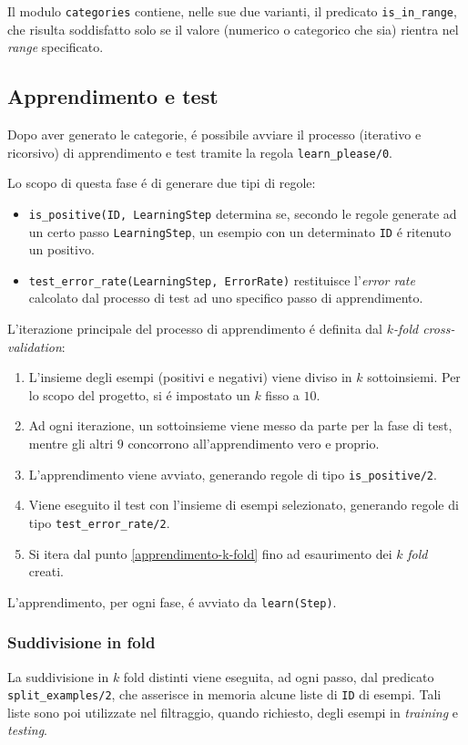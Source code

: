 \documentclass[preprint]{acm_proc_article-sp}
\begin{document}
Il modulo \verb|categories| contiene, nelle sue due varianti, il predicato \verb|is_in_range|, che risulta soddisfatto solo se il valore (numerico o categorico che sia) rientra nel \textit{range} specificato.

\subsection{Apprendimento e test}
\label{prolog-learner}
Dopo aver generato le categorie, \'e possibile avviare il processo (iterativo e ricorsivo) di apprendimento e test tramite la regola \verb|learn_please/0|.

Lo scopo di questa fase \'e di generare due tipi di regole:
\begin{itemize}
\item \verb|is_positive(ID, LearningStep| determina se, secondo le regole generate ad un certo passo \verb|LearningStep|, un esempio con un determinato \verb|ID| \'e ritenuto un positivo.
\item \verb|test_error_rate(LearningStep, ErrorRate)| restituisce l'\textit{error rate} calcolato dal processo di test ad uno specifico passo di apprendimento.
\end{itemize}

L'iterazione principale del processo di apprendimento \'e definita dal $k$\textit{-fold cross-validation}:
\begin{enumerate}
\item L'insieme degli esempi (positivi e negativi) viene diviso in $k$ sottoinsiemi. Per lo scopo del progetto, si \'e impostato un $k$ fisso a $10$.
\item\label{apprendimento-k-fold} Ad ogni iterazione, un sottoinsieme viene messo da parte per la fase di test, mentre gli altri $9$ concorrono all'apprendimento vero e proprio.
\item L'apprendimento viene avviato, generando regole di tipo \verb|is_positive/2|.
\item Viene eseguito il test con l'insieme di esempi selezionato, generando regole di tipo \verb|test_error_rate/2|.
\item Si itera dal punto \ref{apprendimento-k-fold} fino ad esaurimento dei $k$ \textit{fold} creati.
\end{enumerate}

L'apprendimento, per ogni fase, \'e avviato da \verb|learn(Step)|.

\subsubsection{Suddivisione in fold}
La suddivisione in $k$ fold distinti viene eseguita, ad ogni passo, dal predicato \verb|split_examples/2|, che asserisce in memoria alcune liste di \verb|ID| di esempi. Tali liste sono poi utilizzate nel filtraggio, quando richiesto, degli esempi in \textit{training} e \textit{testing}.
\end{document}
